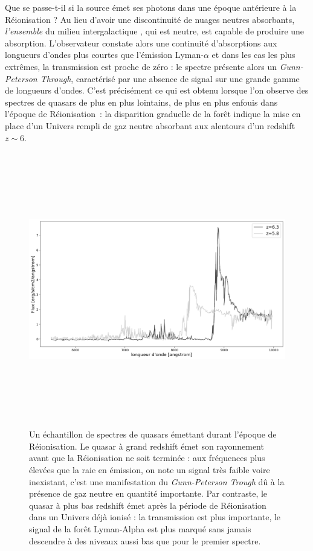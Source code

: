 Que se passe-t-il si la source émet ses photons dans une époque antérieure à la Réionisation ? Au lieu d'avoir une discontinuité de nuages neutres absorbants, \textit{l'ensemble} du milieu intergalactique , qui est neutre, est capable de produire une absorption. L'observateur constate alors une continuité d'absorptions aux longueurs d'ondes plus courtes que l'émission Lyman-$\alpha$ et dans les cas les plus extrêmes, la transmission est proche de zéro : le spectre présente alors un \textit{Gunn-Peterson Through}, caractérisé par une absence de signal sur une grande gamme de longueurs d'ondes. C'est précisément ce qui est obtenu lorsque l'on observe des spectres de quasars de plus en plus lointains, de plus en plus enfouis dans l'époque de Réionisation~: la disparition graduelle de la forêt indique la mise en place d'un Univers rempli de gaz neutre absorbant aux alentours d'un redshift $z\sim 6$.
\begin{figure}[htbp]
	\centering
		\includegraphics[height=12cm]{figs/Becker01.png}
		\caption[Spectres de quasars durant la Réionisation]{Un échantillon de spectres de quasars émettant durant l'époque de Réionisation. Le quasar à grand redshift émet son rayonnement avant que la Réionisation ne soit terminée : aux fréquences plus élevées que la raie en émission, on note un signal très faible voire inexistant, c'est une manifestation du \textit{Gunn-Peterson Trough} dû à la présence de gaz neutre en quantité importante. Par contraste, le quasar à plus bas redshift émet après la période de Réionisation dans un Univers déjà ionisé : la transmission est plus importante, le signal de la forêt Lyman-Alpha est plus marqué sans jamais descendre à des niveaux aussi bas que pour le premier spectre.}
	\label{f:fan06}
\end{figure}

